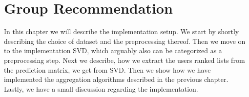 \chapter{Group Recommendation} \label{group_recommendation}
In this chapter we will describe the implementation setup. We start by shortly describing the choice of dataset and the preprocessing thereof. Then we move on to the implementation SVD, which arguably also can be categorized as a preprocessing step. Next we describe, how we extract the users ranked lists from the prediction matrix, we get from SVD. Then we show how we have implemented the aggregation algorithms described in the previous chapter. Lastly, we have a small discussion regarding the implementation.






%